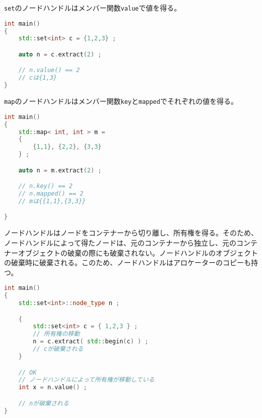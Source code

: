\lstinline!set!のノードハンドルはメンバー関数\lstinline!value!で値を得る。

\begin{lstlisting}[language=C++]
int main()
{
    std::set<int> c = {1,2,3} ;

    auto n = c.extract(2) ;

    // n.value() == 2
    // cは{1,3}
}
\end{lstlisting}

\lstinline!map!のノードハンドルはメンバー関数\lstinline!key!と\lstinline!mapped!でそれぞれの値を得る。

\begin{lstlisting}[language=C++]
int main()
{
    std::map< int, int > m =
    {
        {1,1}, {2,2}, {3,3}
    } ;

    auto n = m.extract(2) ;

    // n.key() == 2 
    // n.mapped() == 2
    // mは{{1,1},{3,3}}

}
\end{lstlisting}

ノードハンドルはノードをコンテナーから切り離し、所有権を得る。そのため、ノードハンドルによって得たノードは、元のコンテナーから独立し、元のコンテナーオブジェクトの破棄の際にも破棄されない。ノードハンドルのオブジェクトの破棄時に破棄される。このため、ノードハンドルはアロケーターのコピーも持つ。

\begin{lstlisting}[language=C++]
int main()
{
    std::set<int>::node_type n ;

    {
        std::set<int> c = { 1,2,3 } ;
        // 所有権の移動
        n = c.extract( std::begin(c) ) ;
        // cが破棄される
    }

    // OK
    // ノードハンドルによって所有権が移動している
    int x = n.value() ;

    // nが破棄される
}
\end{lstlisting}

%

